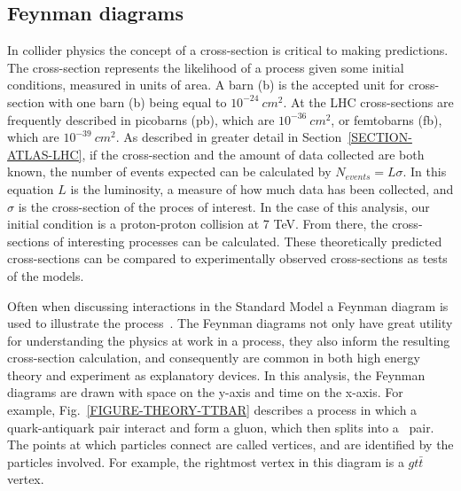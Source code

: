 \subsection{Feynman diagrams}
\label{SECTION-THEORY-FEYNMAN}
In collider physics the concept of a cross-section is critical to making predictions. The cross-section represents the likelihood of a process given some initial conditions, measured in units of area. A barn (b) is the accepted unit for cross-section with one barn (b) being equal to $10^{-24}\ cm^{2}$. At the LHC cross-sections are frequently described in picobarns (pb), which are $10^{-36}\ cm^{2}$, or femtobarns (fb), which are $10^{-39}\ cm^{2}$. As described in greater detail in Section~\ref{SECTION-ATLAS-LHC}, if the cross-section and the amount of data collected are both known, the number of events expected can be calculated by $N_{events}=L\sigma$. In this equation $L$ is the luminosity, a measure of how much data has been collected, and $\sigma$ is the cross-section of the proces of interest. In the case of this analysis, our initial condition is a proton-proton collision at 7 TeV. From there, the cross-sections of interesting processes can be calculated. These theoretically predicted cross-sections can be compared to experimentally observed cross-sections as tests of the models.

Often when discussing interactions in the Standard Model a Feynman diagram is used to illustrate the process~\cite{Griffiths}. The Feynman diagrams not only have great utility for understanding the physics at work in a process, they also inform the resulting cross-section calculation, and consequently are common in both high energy theory and experiment as explanatory devices. In this analysis, the Feynman diagrams are drawn with space on the y-axis and time on the x-axis. For example, Fig.~\ref{FIGURE-THEORY-TTBAR} describes a process in which a quark-antiquark pair interact and form a gluon, which then splits into a \TTbar\ pair. The points at which particles connect are called vertices, and are identified by the particles involved.  For example, the rightmost vertex in this diagram is a $gt\bar{t}$ vertex.

